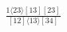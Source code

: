 \documentclass[varwidth, border=5pt]{standalone}
\begin{document}
\begin{my}
$\begin{gathered}
\scriptscriptstyle\frac{1⟨23⟩[13][23]}{[12]⟨13⟩[34]}
\end{gathered}$
\end{my}
\end{document}
